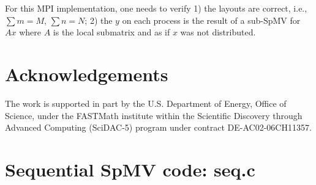 \documentclass[creativecommons]{eptcs}
\begin{document}
For this MPI implementation, one needs to verify 1) the layouts are correct, i.e., $\sum m = M$, $\sum n = N$;
2) the $y$ on each process is the result of a sub-SpMV for $Ax$ where $A$ is the local submatrix and
as if $x$ was not distributed.


\section*{Acknowledgements}
The work is supported in part by the U.S. Department of Energy, Office of Science,
under the FASTMath institute within the Scientific Discovery through Advanced Computing (SciDAC-5) program
under contract DE-AC02-06CH11357.

\nocite{*}



\appendix
\section{Sequential SpMV code: seq.c}
\end{document}

